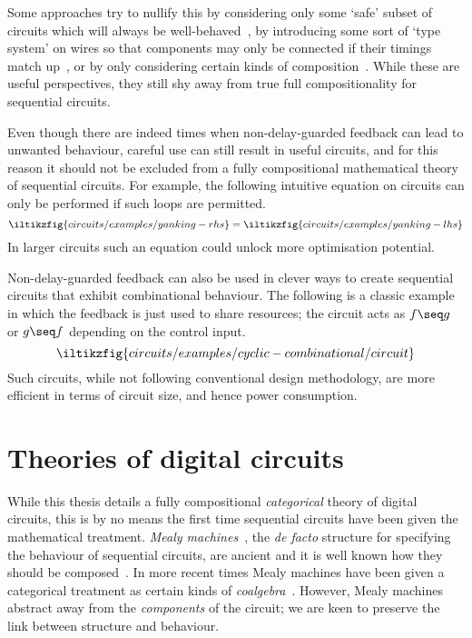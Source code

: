 Some approaches try to nullify this by considering only some `safe' subset of
circuits which will always be well-behaved~\cite{christensen2021wire}, by
introducing some sort of `type system' on wires so that components may only be
connected if their timings match up~\cite{nigam2023modular}, or by only
considering certain kinds of composition~\cite{alekseyev2014compositional}.
While these are useful perspectives, they still shy away from true full
compositionality for sequential circuits.

Even though there are indeed times when non-delay-guarded feedback can lead to
unwanted behaviour, careful use can still result in useful circuits, and for
this reason it should not be excluded from a fully compositional mathematical
theory of sequential circuits.
For example, the following intuitive equation on circuits can only be performed
if such loops are permitted.
\[
    \iltikzfig{circuits/examples/yanking-rhs}
    =
    \iltikzfig{circuits/examples/yanking-lhs}
\]
In larger circuits such an equation could unlock more optimisation potential.

Non-delay-guarded feedback can also be used in clever ways to create sequential
circuits that exhibit combinational behaviour.
The following is a classic example~\cite{malik1994analysis} in which the
feedback is just used to share resources; the circuit acts as \(f \seq g\) or
\(g \seq f\) depending on the control input.
\[
    \iltikzfig{circuits/examples/cyclic-combinational/circuit}
\]
Such circuits, while not following conventional design methodology, are more
efficient in terms of circuit size, and hence power consumption.

\section{Theories of digital circuits}

While this thesis details a fully compositional
\emph{categorical} theory of digital circuits, this is by no means the first
time sequential circuits have been given the mathematical treatment.
\emph{Mealy machines}~\cite{mealy1955method}, the \emph{de facto} structure for
specifying the behaviour of sequential circuits, are ancient and it is well
known how they should be composed~\cite{ginzburg2014algebraic}.
In more recent times Mealy machines have been given a categorical treatment as
certain kinds of \emph{coalgebra}~\cite{rutten2006algebraic,bonsangue2008coalgebraic}.
However, Mealy machines abstract away from the \emph{components} of the circuit;
we are keen to preserve the link between structure and behaviour.

